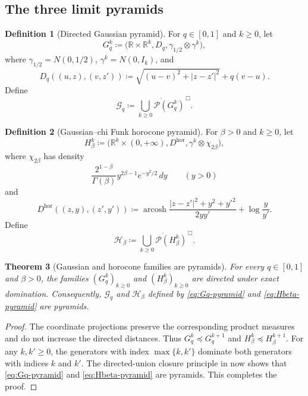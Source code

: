 \documentclass{amsart}
\numberwithin{equation}{section}
\theoremstyle{plain}
\newtheorem{theorem}{Theorem}[section]
\theoremstyle{definition}
\newtheorem{definition}[theorem]{Definition}
\theoremstyle{remark}
\newcommand{\R}{\mathbb R}
\newcommand{\Pyr}{\mathcal P}
\DeclareMathOperator{\arcosh}{arcosh}
\begin{document}
\subsection{The three limit pyramids}

\begin{definition}[Directed Gaussian pyramid]\label{def:directed-gaussian}
For $q\in[0,1]$ and $k\ge0$, let
\[ G_q^k\coloneqq\bigl(\R\times\R^k,D_q,\gamma_{1/2}\otimes\gamma^k\bigr), \]
where $\gamma_{1/2}=N(0,1/2)$, $\gamma^k=N(0,I_k)$, and
\begin{equation}\label{eq:Dq} D_q((u,z),(v,z'))\coloneqq\sqrt{(u-v)^2+|z-z'|^2}+q(v-u). \end{equation}
Define
\begin{equation}\label{eq:Gq-pyramid} \mathcal G_q\coloneqq\overline{\bigcup_{k\ge0}\Pyr(G_q^k)}^{\,\Box}. \end{equation}
\end{definition}

\begin{definition}[Gaussian--chi Funk horocone pyramid]\label{def:horocone}
For $\beta>0$ and $k\ge0$, let
\[ H_\beta^k\coloneqq\bigl(\R^k\times(0,+\infty),D^{\mathrm{hor}},\gamma^k\otimes\chi_{2\beta}\bigr), \]
where $\chi_{2\beta}$ has density
\[ \frac{2^{1-\beta}}{\Gamma(\beta)}y^{2\beta-1}e^{-y^2/2}\,dy \qquad(y>0) \]
and
\begin{equation}\label{eq:horocone-distance} D^{\mathrm{hor}}((z,y),(z',y'))\coloneqq\arcosh\frac{|z-z'|^2+y^2+y'^2}{2yy'}+\log\frac{y}{y'}. \end{equation}
Define
\begin{equation}\label{eq:Hbeta-pyramid} \mathcal H_\beta\coloneqq\overline{\bigcup_{k\ge0}\Pyr(H_\beta^k)}^{\,\Box}. \end{equation}
\end{definition}

\begin{theorem}[Gaussian and horocone families are pyramids]\label{thm:gaussian-horocone-pyramids}
For every $q\in[0,1]$ and $\beta>0$, the families $(G_q^k)_{k\ge0}$ and $(H_\beta^k)_{k\ge0}$ are directed under exact domination.  Consequently, $\mathcal G_q$ and $\mathcal H_\beta$ defined by \eqref{eq:Gq-pyramid} and \eqref{eq:Hbeta-pyramid} are pyramids.
\end{theorem}

\begin{proof}
The coordinate projections preserve the corresponding product measures and do not increase the directed distances.  Thus $G_q^k\preceq G_q^{k+1}$ and $H_\beta^k\preceq H_\beta^{k+1}$.  For any $k,k'\ge0$, the generators with index $\max\{k,k'\}$ dominate both generators with indices $k$ and $k'$.  The directed-union closure principle in  now shows that \eqref{eq:Gq-pyramid} and \eqref{eq:Hbeta-pyramid} are pyramids.
This completes the proof.
\end{proof}
\end{document}
